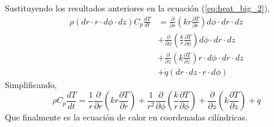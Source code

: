 \documentclass{beamer}
\begin{document}
\begin{frame}{}

\begin{block}{}
	Sustituyendo los resultados anteriores en la ecuación (\ref*{eq:heat_big_2}),
	\begin{equation*}
	\begin{split}
	\rho (dr \cdot r \cdot d\phi \cdot dz) C_p \frac{dT}{dt} &= \frac{\partial}{\partial r} \left(kr\frac{\partial T}{\partial r}\right) d\phi \cdot dr \cdot dz\\
	&+ \frac{\partial}{\partial \phi} \left(\frac{k}{r}\frac{\partial T}{\partial \phi}\right) d\phi \cdot dr \cdot dz\\
	&+\frac{\partial}{\partial z} \left(k\frac{\partial T}{\partial z}\right) r \cdot d\phi \cdot dr \cdot dz\\
	&+\dot{q}(dr \cdot dz \cdot r  \cdot d\phi)
	\end{split}
	\end{equation*}
	Simplificando,
	\begin{equation}
	\rho C_p \frac{dT}{dt} = \frac{1}{r}\frac{\partial}{\partial r} \left(kr\frac{\partial T}{\partial r}\right) + \frac{1}{r^2}\frac{\partial}{\partial \phi} \left(\frac{k}{r}\frac{\partial T}{\partial \phi}\right) + \frac{\partial}{\partial z} \left(k\frac{\partial T}{\partial z}\right) + \dot{q}
	\end{equation}
	Que finalmente es la ecuación de calor en coordenadas cilíndricas.
\end{block}

\end{frame}
\end{document}
